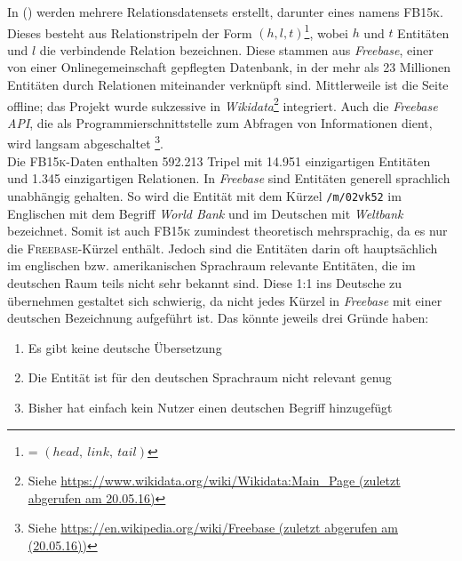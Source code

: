 In (\cite{bordes2013translating}) werden mehrere Relationsdatensets erstellt, darunter eines namens \textsc{FB15k}. Dieses
besteht aus Relationstripeln der Form $(h, l, t)$\footnote{= $(head,\ link,\ tail)$}, wobei
$h$ und $t$ Entitäten und $l$ die verbindende Relation bezeichnen. Diese stammen aus \emph{Freebase}, einer
von einer Onlinegemeinschaft gepflegten Datenbank, in der mehr als 23 Millionen Entitäten durch Relationen miteinander verknüpft sind.
Mittlerweile ist die Seite offline; das Projekt wurde sukzessive in \emph{Wikidata}\footnote{Siehe \url{https://www.wikidata.org/wiki/Wikidata:Main_Page (zuletzt abgerufen am 20.05.16)}} integriert. Auch die
\emph{Freebase API}, die als Programmierschnittstelle zum Abfragen von Informationen dient, wird langsam abgeschaltet
\footnote{Siehe \url{https://en.wikipedia.org/wiki/Freebase (zuletzt abgerufen am (20.05.16))}}.\\

Die \textsc{FB15k}-Daten enthalten 592.213 Tripel mit 14.951 einzigartigen Entitäten und 1.345 einzigartigen Relationen.
In \emph{Freebase} sind Entitäten generell sprachlich unabhängig gehalten. So wird die Entität mit dem Kürzel \verb|/m/02vk52|
im Englischen mit dem Begriff \emph{World Bank} und im Deutschen mit \emph{Weltbank} bezeichnet. Somit ist auch
\textsc{FB15k} zumindest theoretisch mehrsprachig, da es nur die \textsc{Freebase}-Kürzel enthält.
Jedoch sind die Entitäten darin oft hauptsächlich im englischen bzw. amerikanischen Sprachraum relevante
Entitäten, die im deutschen Raum teils nicht sehr bekannt sind. Diese 1:1 ins Deutsche zu übernehmen gestaltet sich schwierig,
da nicht jedes Kürzel in \emph{Freebase} mit einer deutschen Bezeichnung aufgeführt ist. Das könnte jeweils drei Gründe haben:

\begin{enumerate}
  \item Es gibt keine deutsche Übersetzung
  \item Die Entität ist für den deutschen Sprachraum nicht relevant genug
  \item Bisher hat einfach kein Nutzer einen deutschen Begriff hinzugefügt
\end{enumerate}

